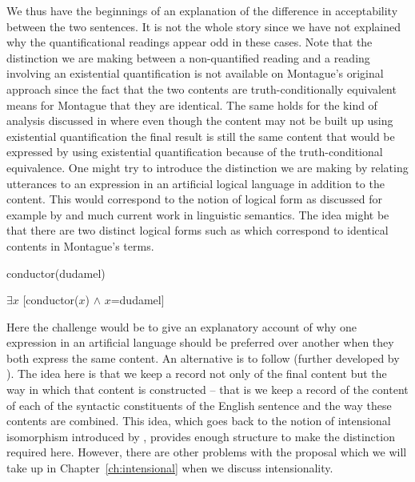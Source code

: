 We thus have the beginnings of an explanation of the difference in
acceptability between the two sentences.  It is not the whole story
since we have not explained why the quantificational readings appear
odd in these cases.  Note that the distinction we are making between a
non-quantified reading and a reading involving an existential
quantification is not available on Montague's \citeyear{Montague1973}
original approach since the fact that the two contents are
truth-conditionally equivalent means for Montague that they are
identical.  The same holds for the kind of analysis discussed in
\cite{Partee1986} where even though the content may not be built up
using existential quantification the final result is still the same
content that would be expressed by using existential quantification
because of the truth-conditional equivalence.  One might try to
introduce the distinction we are making by relating utterances to an expression
in an artificial logical language in addition to the content.  This
would correspond to the notion of logical form as discussed for
example by \cite{HeimKratzer1998} and much current work in linguistic
semantics.  The idea might be that there are two distinct logical
forms such as \nexteg{} which correspond to identical contents in
Montague's terms.
\begin{ex} 
\begin{subex} 
 
\item conductor(dudamel) 
 
\item $\exists x$ [conductor($x$) $\wedge$ $x$=dudamel] 
 
\end{subex} 
   
\end{ex} 
Here the challenge would be to give an explanatory account of why one
expression in an artificial language  should be preferred
over another  when they both express the same content.  An
alternative is to follow \cite{Lewis1972} (further developed by
\citealp{Cresswell1985}). The idea here is that we keep a record not
only of the final content but the way in which that content is
constructed -- that is we keep a record of the content of each of the syntactic
constituents of the English sentence and the way these contents are
combined.  This idea, which goes back to the notion of intensional
isomorphism introduced by \cite{Carnap1956}, provides enough structure
to make the distinction required here.  However, there are other
problems with the proposal which we will take up in
Chapter~\ref{ch:intensional} when we discuss intensionality. 

